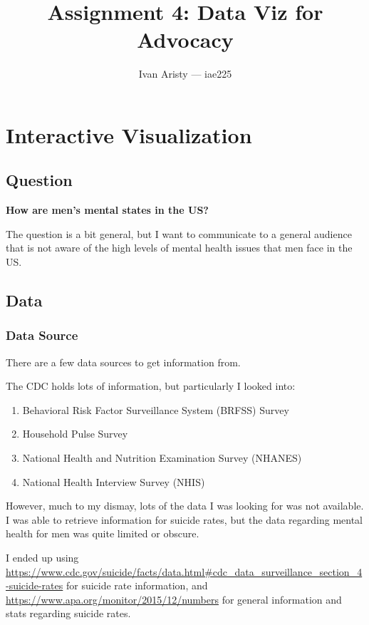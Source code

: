 \documentclass{article}
\title{Assignment 4: Data Viz for Advocacy}
\author{Ivan Aristy — iae225}
\begin{document}
  \maketitle %
  \thispagestyle{empty}

\section{Interactive Visualization}

\subsection{Question}
\label{subsec:subsec1}

\textbf{How are men's mental states in the US?}

The question is a bit general, but I want to communicate to a general audience
that is not aware of the high levels of mental health issues that men face in the US.

\subsection{Data}
\label{subsec:subsec2}

\subsubsection{Data Source}
\label{subsubsec:Data Source}

There are a few data sources to get information from.

The CDC holds lots of information, but particularly I looked into:

\begin{enumerate}
  \item Behavioral Risk Factor Surveillance System (BRFSS) Survey
  \item Household Pulse Survey
  \item National Health and Nutrition Examination Survey (NHANES)
  \item National Health Interview Survey (NHIS)
\end{enumerate}

However, much to my dismay, lots of the data I was looking for 
was not available. I was able to retrieve information for suicide rates,
but the data regarding mental health for men was quite limited or obscure.

I ended up using \url{https://www.cdc.gov/suicide/facts/data.html#cdc_data_surveillance_section_4-suicide-rates}
for suicide rate information, and \url{https://www.apa.org/monitor/2015/12/numbers}
for general information and stats regarding suicide rates.
\end{document}

